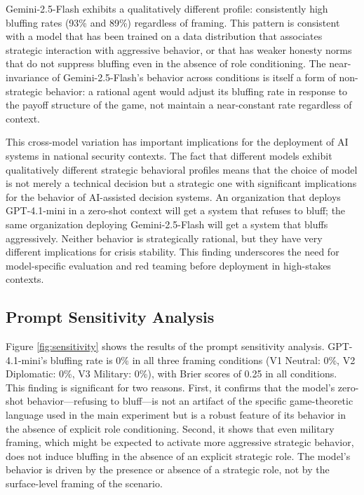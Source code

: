 \documentclass[12pt]{article}
\theoremstyle{plain}
\theoremstyle{definition}
\begin{document}
Gemini-2.5-Flash exhibits a qualitatively different profile: consistently high bluffing rates (93\% and 89\%) regardless of framing. This pattern is consistent with a model that has been trained on a data distribution that associates strategic interaction with aggressive behavior, or that has weaker honesty norms that do not suppress bluffing even in the absence of role conditioning. The near-invariance of Gemini-2.5-Flash's behavior across conditions is itself a form of non-strategic behavior: a rational agent would adjust its bluffing rate in response to the payoff structure of the game, not maintain a near-constant rate regardless of context.

This cross-model variation has important implications for the deployment of AI systems in national security contexts. The fact that different models exhibit qualitatively different strategic behavioral profiles means that the choice of model is not merely a technical decision but a strategic one with significant implications for the behavior of AI-assisted decision systems. An organization that deploys GPT-4.1-mini in a zero-shot context will get a system that refuses to bluff; the same organization deploying Gemini-2.5-Flash will get a system that bluffs aggressively. Neither behavior is strategically rational, but they have very different implications for crisis stability. This finding underscores the need for model-specific evaluation and red teaming before deployment in high-stakes contexts.

\subsection{Prompt Sensitivity Analysis}

Figure \ref{fig:sensitivity} shows the results of the prompt sensitivity analysis. GPT-4.1-mini's bluffing rate is 0\% in all three framing conditions (V1 Neutral: 0\%, V2 Diplomatic: 0\%, V3 Military: 0\%), with Brier scores of 0.25 in all conditions. This finding is significant for two reasons. First, it confirms that the model's zero-shot behavior---refusing to bluff---is not an artifact of the specific game-theoretic language used in the main experiment but is a robust feature of its behavior in the absence of explicit role conditioning. Second, it shows that even military framing, which might be expected to activate more aggressive strategic behavior, does not induce bluffing in the absence of an explicit strategic role. The model's behavior is driven by the presence or absence of a strategic role, not by the surface-level framing of the scenario.
\end{document}
